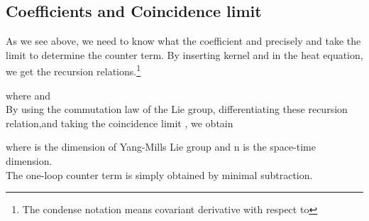 \documentclass[a4paper,12 pt]{article}
\begin{document}
\subsection{Coefficients and Coincidence limit}
As we see above, we need to know what the coefficient
\coordHE{} and \coordHE{} precisely and take the limit \coordHE{} to determine the counter term. By inserting
kernel \coordHE{} and \coordHE{}in the heat equation, we get the
recursion relations.\footnote{The condense notation \coordHE{}
means covariant derivative with respect to \myHighlight{$\mu $}\coordHE{}}
\begin{center}
\coordHE{}
\end{center}
\begin{center}
\coordHE{}
\end{center}
\begin{center}
\coordHE{}
\end{center}
where \coordHE{} and \coordHE{} \\
By using the commutation law of the Lie group, differentiating
these recursion relation,and taking the coincidence limit
\coordHE{}, we obtain
\begin{center} \coordHE{}
\end{center}
\begin{center}
\coordHE{}
\end{center}
where \coordHE{} is the dimension of Yang-Mills Lie group and n is the
space-time dimension.\\
The one-loop counter term is simply obtained by minimal
subtraction.
\begin{center} \coordHE{}
\end{center}
\end{document}
